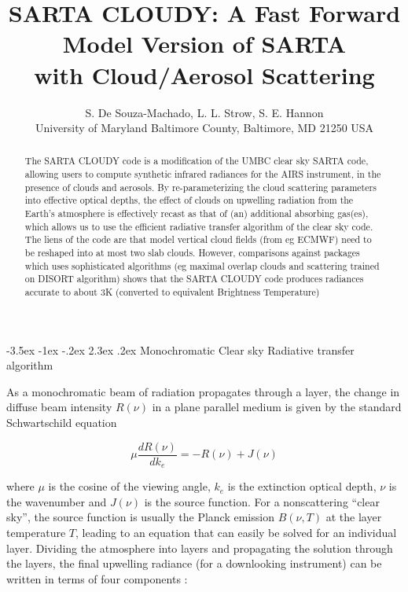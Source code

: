 \documentclass[11pt]{article}
\title{\textsf{SARTA CLOUDY}: A Fast Forward Model Version of
  \textsf{SARTA}\\ with Cloud/Aerosol Scattering}
\author{S. De Souza-Machado, L. L. Strow, S. E. Hannon \\
      University of Maryland Baltimore County, Baltimore, MD 21250 USA}
\makeatletter
\renewcommand{\section}{\@startsection {section}{1}{\z@}%
                                   {-3.5ex \@plus -1ex \@minus -.2ex}%
                                   {2.3ex \@plus.2ex}%
                                   {\reset@font\large\bfseries}}
\makeatother
\begin{document}
\maketitle

\begin{abstract}

The \textsf{SARTA CLOUDY} code is a modification of the UMBC clear sky \textsf{SARTA} code, allowing users to compute 
synthetic infrared radiances for the AIRS instrument, in the presence of clouds and aerosols. By re-parameterizing the
cloud scattering parameters into effective optical depths, the effect of clouds on upwelling radiation from
the Earth's atmosphere is effectively recast as that of (an) additional absorbing gas(es), which allows us to use 
the efficient radiative transfer algorithm of the clear sky code. The liens of the code are that model vertical cloud
fields (from eg ECMWF) need to be reshaped into at most two slab clouds. However, comparisons against packages 
which uses sophisticated algorithms (eg maximal overlap clouds and scattering trained on DISORT algorithm) shows that
the \textsf{SARTA CLOUDY} code produces radiances accurate to about 3K (converted to equivalent Brightness Temperature)

\end{abstract}

\section{Monochromatic Clear sky Radiative transfer algorithm}

As a monochromatic beam of radiation propagates through a layer, the change in diffuse beam
intensity $R(\nu)$ in a plane parallel medium is given by the standard
Schwartschild equation \cite{lio:80,goo:89,edw:92}

\begin{equation}
\mu \frac{dR(\nu)}{dk_{e}} = -R(\nu) + J(\nu)
\label{eqn:sch}
\end{equation}

where $\mu$ is the cosine of the viewing angle, $k_{e}$ is the extinction
optical depth, $\nu$ is the wavenumber and $J(\nu)$ is the source function. For
a nonscattering ``clear sky'', the source function is usually the Planck
emission $B(\nu,T)$ at the layer temperature $T$, leading to an equation that
can easily be solved for an individual layer. Dividing the atmosphere into
layers and propagating the solution through the layers, the final upwelling radiance
(for a downlooking instrument) can be written in terms of four components :
\end{document}
